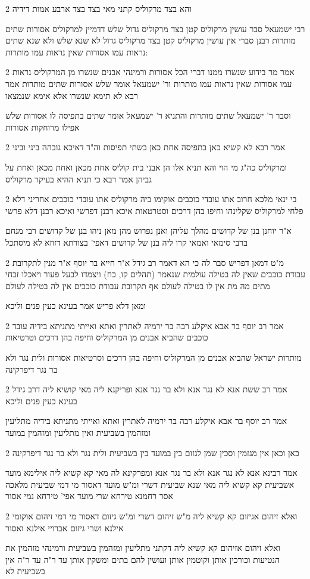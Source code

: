 \documentclass[12pt, openany]{book}
\newcommand{\sethebfont}{
\fontsize{10.5pt}{21.0pt} \selectfont
}
\newcommand{\twocol}[1]{
	{\sethebfont \begin{multicols}{2}
			#1
	\end{multicols}}	
}
\begin{document}
\twocol{והא בצד מרקוליס קתני מאי בצד בצד ארבע אמות דידיה
\par רבי ישמעאל סבר עושין מרקוליס קטן בצד מרקוליס גדול שלש דדמיין למרקוליס אסורות שתים מותרות רבנן סברי אין עושין מרקוליס קטן בצד מרקוליס גדול לא שנא שלש ולא שנא שתים נראות עמו אסורות שאין נראות עמו מותרות:}
\twocol{אמר מר בידוע שנשרו ממנו דברי הכל אסורות ורמינהי אבנים שנשרו מן המרקוליס נראות עמו אסורות שאין נראות עמו מותרות ור' ישמעאל אומר שלש אסורות שתים מותרות אמר רבא לא תימא שנשרו אלא אימא שנמצאו
\par וסבר ר' ישמעאל שתים מותרות והתניא ר' ישמעאל אומר שתים בתפיסה לו אסורות שלש אפילו מרוחקות אסורות}
\twocol{אמר רבא לא קשיא כאן בתפיסה אחת כאן בשתי תפיסות וה"ד דאיכא גובהה ביני וביני
\par ומרקוליס כה"ג מי הוי והא תניא אלו הן אבני בית קוליס אחת מכאן ואחת מכאן ואחת על גביהן אמר רבא כי תניא ההיא בעיקר מרקוליס}
\twocol{בי ינאי מלכא חרוב אתו עובדי כוכבים אוקימו ביה מרקוליס אתו עובדי כוכבים אחריני דלא פלחי למרקוליס שקלינהו וחיפו בהן דרכים וסטרטאות איכא רבנן דפרשי ואיכא רבנן דלא פרשי
\par א"ר יוחנן בנן של קדושים מהלך עליהן ואנן נפרוש מהן מאן ניהו בנן של קדושים רבי מנחם ברבי סימאי ואמאי קרו ליה בנן של קדושים דאפי' בצורתא דזוזא לא מיסתכל}
\twocol{מ"ט דמאן דפריש סבר לה כי הא דאמר רב גידל א"ר חייא בר יוסף א"ר מנין לתקרובת עבודת כוכבים שאין לה בטילה עולמית שנאמר (תהלים קו, כח) ויצמדו לבעל פעור ויאכלו זבחי מתים מה מת אין לו בטילה לעולם אף תקרובת עבודת כוכבים אין לה בטילה לעולם
\par ומאן דלא פריש אמר בעינא כעין פנים וליכא}
\twocol{אמר רב יוסף בר אבא איקלע רבה בר ירמיה לאתרין ואתא ואייתי מתניתא בידיה עובד כוכבים שהביא אבנים מן המרקוליס וחיפה בהן דרכים וטרטיאות
\par מותרות ישראל שהביא אבנים מן המרקוליס וחיפה בהן דרכים וסרטיאות אסורות ולית נגר ולא בר נגר דיפרקינה}
\twocol{אמר רב ששת אנא לא נגר אנא ולא בר נגר אנא ופריקנא ליה מאי קושיא ליה דרב גידל בעינא כעין פנים וליכא
\par אמר רב יוסף בר אבא איקלע רבה בר ירמיה לאתרין ואתא ואייתי מתניתא בידיה מתליעין ומזהמין בשביעית ואין מתליעין ומזהמין במועד}
\twocol{כאן וכאן אין מגזמין וסכין שמן לגזום בין במועד בין בשביעית ולית נגר ולא בר נגר דיפרקינה
\par אמר רבינא אנא לא נגר אנא ולא בר נגר אנא ומפרקינא לה מאי קא קשיא ליה אילימא מועד אשביעית קא קשיא ליה מאי שנא שביעית דשרי ומ"ש מועד דאסור מי דמי שביעית מלאכה אסר רחמנא טירחא שרי מועד אפי' טירחא נמי אסור}
\twocol{ואלא זיהום אגיזום קא קשיא ליה מ"ש זיהום דשרי ומ"ש גיזום דאסור מי דמי זיהום אוקומי אילנא ושרי גיזום אברויי אילנא ואסור
\par ואלא זיהום אזיהום קא קשיא ליה דקתני מתליעין ומזהמין בשביעית ורמינהי מזהמין את הנטיעות וכורכין אותן וקוטמין אותן ועושין להם בתים ומשקין אותן עד ר"ה עד ר"ה אין בשביעית לא}
\end{document}
